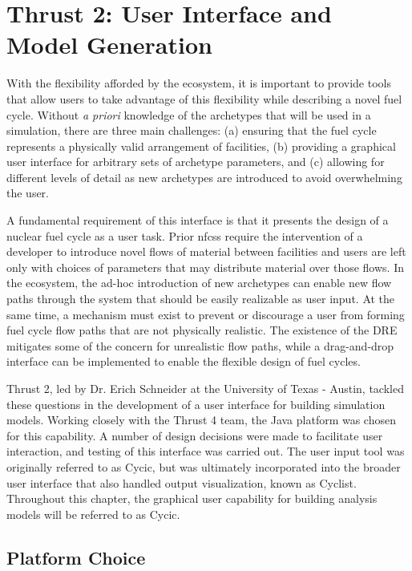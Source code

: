 \chapter{Thrust 2: User Interface and Model Generation}\label{chap:thrust2}

With the flexibility afforded by the \Cyclus ecosystem, it is important to
provide tools that allow users to take advantage of this flexibility while
describing a novel fuel cycle.  Without \emph{a priori} knowledge of the
archetypes that will be used in a simulation, there are three main challenges:
(a) ensuring that the fuel cycle represents a physically valid arrangement of
facilities, (b) providing a graphical user interface for arbitrary sets of
archetype parameters, and (c) allowing for different levels of detail as new
archetypes are introduced to avoid overwhelming the user.

A fundamental requirement of this interface is that it presents the design of
a nuclear fuel cycle as a user task.  Prior \glspl{nfcs} require the
intervention of a developer to introduce novel flows of material between
facilities and users are left only with choices of parameters that may
distribute material over those flows.  In the \Cyclus ecosystem, the ad-hoc
introduction of new archetypes can enable new flow paths through the system
that should be easily realizable as user input.  At the same time, a mechanism
must exist to prevent or discourage a user from forming fuel cycle flow paths
that are not physically realistic.  The existence of the \gls{DRE} mitigates
some of the concern for unrealistic flow paths, while a drag-and-drop
interface can be implemented to enable the flexible design of fuel cycles.

Thrust 2, led by Dr. Erich Schneider at the University of Texas - Austin,
tackled these questions in the development of a user interface for building
simulation models.  Working closely with the Thrust 4 team, the Java platform
was chosen for this capability.  A number of design decisions were made to
facilitate user interaction, and testing of this interface was carried out.
The user input tool was originally referred to as Cycic, but was ultimately
incorporated into the broader user interface that also handled output
visualization, known as Cyclist.  Throughout this chapter,
the graphical user capability for building analysis models will be referred to
as Cycic.

\section{Platform Choice}

